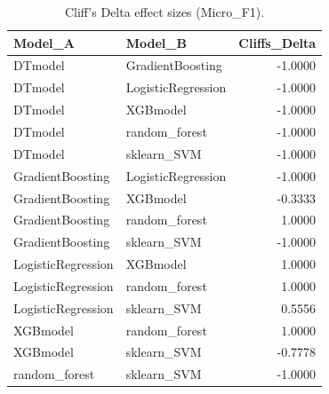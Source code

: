 \begin{table}[t]
\centering
\begin{tabular}{llr}
\toprule
Model_A & Model_B & Cliffs_Delta \\
\midrule
DTmodel & GradientBoosting & -1.0000 \\
DTmodel & LogisticRegression & -1.0000 \\
DTmodel & XGBmodel & -1.0000 \\
DTmodel & random_forest & -1.0000 \\
DTmodel & sklearn_SVM & -1.0000 \\
GradientBoosting & LogisticRegression & -1.0000 \\
GradientBoosting & XGBmodel & -0.3333 \\
GradientBoosting & random_forest & 1.0000 \\
GradientBoosting & sklearn_SVM & -1.0000 \\
LogisticRegression & XGBmodel & 1.0000 \\
LogisticRegression & random_forest & 1.0000 \\
LogisticRegression & sklearn_SVM & 0.5556 \\
XGBmodel & random_forest & 1.0000 \\
XGBmodel & sklearn_SVM & -0.7778 \\
random_forest & sklearn_SVM & -1.0000 \\
\bottomrule
\end{tabular}
\caption{Cliff's Delta effect sizes (Micro_F1).}
\label{tab:cliffs_Micro_F1}
\end{table}